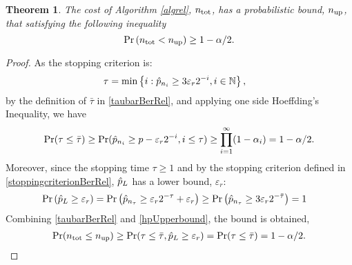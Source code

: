 \documentclass{iitthesis}
\newtheorem{theorem}{Theorem}[section]
\theoremstyle{definition}
\begin{document}
\begin{theorem} \label{costupperboundrel}
The cost of Algorithm \ref{algrel}, $n_{\operatorname{tot}}$,  has a probabilistic bound, $n_{\operatorname{up}}$, that satisfying the following inequality
\begin{equation}
\Pr\left(n_{\operatorname{tot}}<n_{\operatorname{up}}\right) \geq 1-\alpha/2.
\end{equation}
\end{theorem}
\begin{proof}
As the stopping criterion is: 
\begin{align*}
\tau &= \min\left\{i: \hat{p}_{n_i}\geq 3\varepsilon_r 2^{-i}, i \in \mathbb{N} \right \},
\end{align*}
by the definition of $\bar{\tau}$ in \eqref{taubarBerRel}, and applying one side Hoeffding's Inequality, we have
\begin{align} \label{tauboundBerRel}
\Pr (\tau \leq \bar{\tau}) \geq \Pr (\hat{p}_{n_i} \geq  p-\varepsilon_r2^{-i}, i \leq \tau )
\geq \prod_{i=1}^\infty(1-\alpha_i) = 1-\alpha/2.
\end{align}
Moreover, since the stopping time $\tau \geq 1$ and by the stopping criterion defined in \eqref{stoppingcriterionBerRel}, $\hat{p}_L$ has a lower bound, $\varepsilon_r$:
\begin{align}\label{hpUpperbound}
\Pr\left(\hat{p}_L  \geq  \varepsilon_r \right)& = \Pr\left(\hat{p}_{n_\tau} \geq \varepsilon_r 2^{-\tau}+\varepsilon_r  \right) \geq \Pr\left(\hat{p}_{n_{\tau}}\geq 3\varepsilon_r2^{-{\bar{\tau}}}\right) =1
\end{align}
Combining \eqref{taubarBerRel} and \eqref{hpUpperbound}, the bound is obtained,
\begin{align*}
\Pr(n_{\operatorname{tot}} \leq n_{\operatorname{up}})  \geq \Pr(\tau \leq \bar{\tau}, \hat{p}_L \geq \varepsilon_r) =  \Pr(\tau \leq \bar{\tau}) =1-\alpha/2.
\end{align*}
\end{proof}
\end{document}
